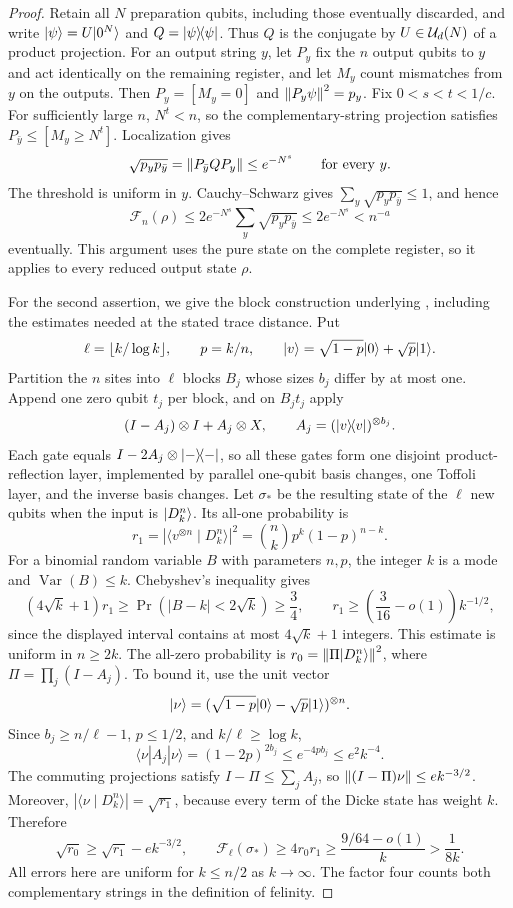 \begin{proof}
Retain all $N$ preparation qubits, including those eventually discarded,
and write $\lvert \psi\rangle=U\lvert 0^N\rangle$ and $Q=\lvert \psi\rangle\!\langle \psi\rvert$. Thus $Q$ is the
conjugate by $U\in\mathcal U_d(N)$ of a product projection. For an output string
$y$, let $P_y$ fix the $n$ output qubits to $y$ and act identically on the
remaining register, and let $M_y$ count mismatches from $y$ on the outputs.
Then $P_y=[M_y=0]$ and $\left\lVert P_y\psi\right\rVert^2=p_y$. Fix $0<s<t<1/c$.
For sufficiently large $n$, $N^t<n$, so the complementary-string
projection satisfies $P_{\bar y}\le[M_y\ge N^t]$. Localization gives
\[
 \sqrt{p_y p_{\bar y}}
 =\left\lVert P_{\bar y}QP_y\right\rVert\le e^{-N^s}
 \qquad\text{for every }y.
\]
The threshold is uniform in $y$. Cauchy--Schwarz gives
$\sum_y\sqrt{p_y p_{\bar y}}\le1$, and hence
\[
 \mathcal F_n(\rho)
 \le2e^{-N^s}\sum_y\sqrt{p_y p_{\bar y}}
 \le2e^{-N^s}<n^{-a}
\]
eventually. This argument uses the pure state on the complete register,
so it applies to every reduced output state $\rho$.

For the second assertion, we give the block construction underlying
\cite[Lemma~4.13 and Theorem~4.14]{GGJ2026}, including the estimates
needed at the stated trace distance. Put
\[
 \ell=\lfloor k/\log k\rfloor,\qquad p=k/n,\qquad
 \lvert v\rangle=\sqrt{1-p}\lvert 0\rangle+\sqrt p\lvert 1\rangle.
\]
Partition the $n$ sites into $\ell$ blocks $B_j$ whose sizes $b_j$ differ
by at most one. Append one zero qubit $t_j$ per block, and on $B_jt_j$ apply
\[
 (I-A_j)\otimes I+A_j\otimes X,
 \qquad A_j=(\lvert v\rangle\!\langle v\rvert)^{\otimes b_j}.
\]
Each gate equals $I-2A_j\otimes\lvert -\rangle\!\langle -\rvert$, so all these gates form one
disjoint product-reflection layer, implemented by parallel one-qubit basis
changes, one Toffoli layer, and the inverse basis changes.
Let $\sigma_*$ be the resulting state of the $\ell$ new qubits when the
input is $\lvert D_k^n\rangle$. Its all-one probability is
\[
 r_1=|\langle v^{\otimes n}\mid D_k^n\rangle|^2
     =\binom nk p^k(1-p)^{n-k}.
\]
For a binomial random variable $B$ with parameters $n,p$, the integer $k$
is a mode and $\operatorname{Var}(B)\le k$. Chebyshev's inequality gives
\[
 (4\sqrt k+1)r_1\ge\Pr(|B-k|<2\sqrt k)\ge\frac34,
 \qquad r_1\ge\left(\frac3{16}-o(1)\right)k^{-1/2},
\]
since the displayed interval contains at most $4\sqrt k+1$ integers.
This estimate is uniform in $n\ge2k$. The all-zero probability is
$r_0=\left\lVert \Pi\lvert D_k^n\rangle\right\rVert^2$, where $\Pi=\prod_j(I-A_j)$.
To bound it, use the unit vector
\[
 \lvert \nu\rangle=(\sqrt{1-p}\lvert 0\rangle-\sqrt p\lvert 1\rangle)^{\otimes n}.
\]
Since $b_j\ge n/\ell-1$, $p\le1/2$, and $k/\ell\ge\log k$,
\[
 \langle\nu|A_j|\nu\rangle=(1-2p)^{2b_j}
 \le e^{-4pb_j}\le e^2k^{-4}.
\]
The commuting projections satisfy $I-\Pi\le\sum_jA_j$, so
$\left\lVert (I-\Pi)\nu\right\rVert\le e k^{-3/2}$. Moreover,
$|\langle\nu\mid D_k^n\rangle|=\sqrt{r_1}$, because every term of the
Dicke state has weight $k$. Therefore
\[
 \sqrt{r_0}\ge\sqrt{r_1}-e k^{-3/2},\qquad
 \mathcal F_\ell(\sigma_*)\ge4r_0r_1
       \ge\frac{9/64-o(1)}k>\frac1{8k}.
\]
All errors here are uniform for $k\le n/2$ as $k\to\infty$.
The factor four counts both complementary strings in the definition
of felinity.


\end{proof}
